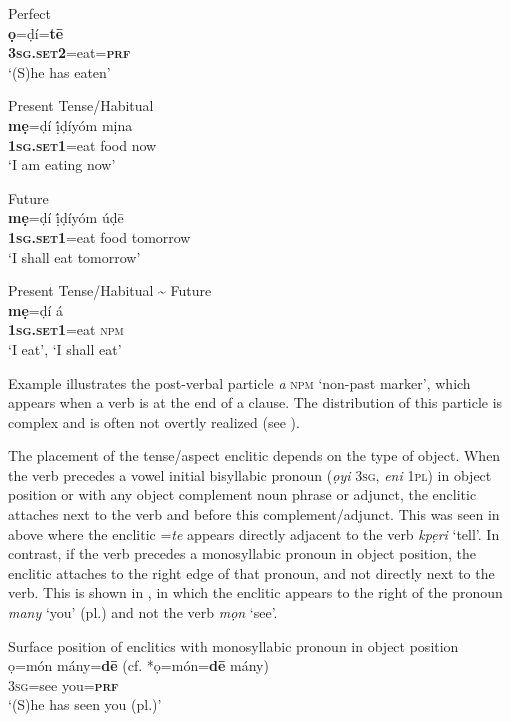 \documentclass[output=paper]{langsci/langscibook}
\begin{document}
\ea\label{ex:rolle:4}
Perfect\\
\gll  \textbf{ọ}=ḍí=\textbf{tē}\\
     \textbf{\textsc{3sg.set2}}=eat=\textbf{\textsc{prf}}\\
\glt ‘(S)he has eaten’ \citep[284]{Kari2004}
\z

\ea\label{ex:rolle:5}
Present Tense/Habitual\\
\gll  \textbf{mẹ}=ḍí     ị́ḍíyóm   mịna\\
     \textbf{\textsc{1sg.set1}}=eat   food   now\\
\glt ‘I am eating now’ \citep[45]{Kari1997}
\z

\ea\label{ex:rolle:6}
Future\\
\gll  \textbf{mẹ}=ḍí     ị́ḍíyóm   úḍē\\
     \textbf{\textsc{1sg.set1}}=eat   food   tomorrow\\
\glt ‘I shall eat tomorrow’ \citep[45]{Kari1997}
\z

\ea\label{ex:rolle:7}
Present Tense/Habitual {\textasciitilde} Future\\
\gll  \textbf{mẹ}=ḍí     á\\
     \textbf{\textsc{1sg.set1}}=eat  \textsc{npm}\\
\glt ‘I eat’, ‘I shall eat’ \citep[45]{Kari1997}
\z

Example  illustrates the post-verbal particle \textit{a} \textsc{npm} ‘non-past marker’, which appears when a verb is at the end of a clause. The distribution of this particle is complex and is often not overtly realized (see \citealt[278--280]{Kari2004}).

The placement of the tense/aspect enclitic depends on the type of object. When the verb precedes a vowel initial bisyllabic pronoun (\textit{ọyi} \textsc{3sg}, \textit{eni} \textsc{1pl}) in object position or with any object complement noun phrase or adjunct, the enclitic attaches next to the verb and before this complement/adjunct. This was seen in  above where the enclitic =\textit{te} appears directly adjacent to the verb \textit{kpẹri} ‘tell’. In contrast, if the verb precedes a monosyllabic pronoun in object position, the enclitic attaches to the right edge of that pronoun, and not directly next to the verb. This is shown in , in which the enclitic appears to the right of the pronoun \textit{many} ‘you’ (pl.) and not the verb \textit{mọn} ‘see’.

\ea\label{ex:rolle:8}
{Surface position of enclitics with monosyllabic pronoun in object position}\\
\gll  ọ=món   mány=\textbf{dē}  (cf. *ọ=món=\textbf{dē} mány)\\
     3\textsc{sg}=see   you=\textbf{\textsc{prf}}\\
\glt ‘(S)he has seen you (pl.)’ \citep[341]{Kari2004} 
\z
\end{document}
